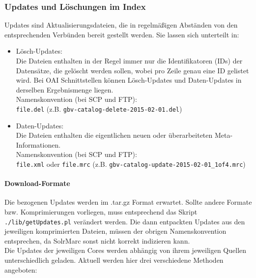 \documentclass[10pt]{article}
\begin{document}
\subsubsection{Updates und Löschungen im Index}
\label{sec:subsub:Updates}
Updates sind Aktualisierungsdateien, die in regelmäßigen Abständen von den entsprechenden Verbünden bereit gestellt werden. Sie lassen sich unterteilt in: 
\begin{itemize}
	\item Lösch-Updates: \\
		Die Dateien enthalten in der Regel immer nur die Identifikatoren (IDs) der Datensätze, die gelöscht werden sollen, wobei pro Zeile genau eine ID gelistet wird. Bei OAI Schnittstellen können Lösch-Updates und Daten-Updates in derselben Ergebnismenge liegen. \\
		Namenskonvention (bei SCP und FTP): \\
		\texttt{file.del} (z.B. \texttt{gbv-catalog-delete-2015-02-01.del})
	\item Daten-Updates: \\
		Die Dateien enthalten die eigentlichen neuen oder überarbeiteten Meta-Informationen. \\
		Namenskonvention (bei SCP und FTP):\\
		\texttt{file.xml} oder \texttt{file.mrc} (z.B. \texttt{gbv-catalog-update-2015-02-01\_1of4.mrc})
\end{itemize}

\paragraph{Download-Formate}
Die bezogenen Updates werden im .tar.gz Format erwartet. Sollte andere Formate bzw. Komprimierungen vorliegen, muss entsprechend das Skript \texttt{./lib/getUpdates.pl} verändert werden. Die dann entpackten Updates aus den jeweiligen komprimierten Dateien, müssen der obrigen Namenskonvention entsprechen, da SolrMarc sonst nicht korrekt indizieren kann. \\
Die Updates der jeweiligen Cores werden abhängig von ihrem jeweiligen Quellen unterschiedlich geladen. Aktuell werden hier drei verschiedene Methoden angeboten: 
\end{document}
